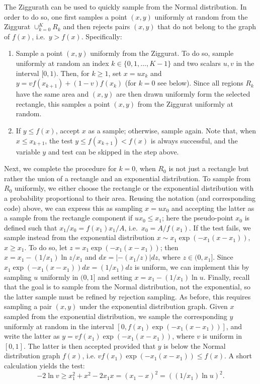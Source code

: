 The Ziggurath can be used to quickly sample from the Normal distribution. In order to do so, one first samples a point $(x,y)$ uniformly at random from the Ziggurat $\cup_{k=0}^K R_k$ and then rejects pairs $(x,y)$ that do not belong to the graph of $f(x)$, i.e.\ $y > f(x)$. Specifically:
\begin{enumerate}
\item Sample a point $(x,y)$ uniformly from the Ziggurat. To do so, sample uniformly at random an index $k \in\{0,1,\dots,K-1\}$ and two scalars $u,v$ in the interval $[0,1)$. Then, for $k\geq 1$, set $x = u x_k$ and $y = v f(x_{k+1}) + (1-v)f(x_k)$ (for $k=0$ see below). Since all regions $R_k$ have the same area and $(x,y)$ are then drawn uniformly form the selected rectangle, this samples a point $(x,y)$ from the Ziggurat uniformly at random.
\item If $y \leq f(x)$, accept $x$ as a sample; otherwise, sample again. Note that, when $x \leq x_{k+1}$, the test $y \leq f(x_{k+1}) < f(x)$ is always successful, and the variable $y$ and test can be skipped in the step above.
\end{enumerate}
Next, we complete the procedure for $k=0$, when $R_0$ is not just a rectangle but rather the union of a rectangle and an exponential distribution. To sample from $R_0$ uniformly, we either choose the rectangle or the exponential distribution with a probability proportional to their area. Reusing the notation (and corresponding code) above, we can express this as sampling $x = u x_0$ and accepting the latter as a sample from the rectangle component if $ux_0 \leq x_1$; here the pseudo-point $x_0$ is defined such that $x_1 / x_0 = f(x_1)x_1 / A$, i.e.\ $x_0 = A/f(x_1)$. If the test fails, we sample instead from the exponential distribution $x\sim x_1\exp(-x_1(x-x_1)),$ $x\geq x_1$. To do so, let $z= x_1\exp(-x_1(x-x_1))$; then $x = x_1 - (1/x_1) \ln z/x_1$ and $dx = |- (x_1/z)|dz$, where $z\in(0,x_1]$. Since $x_1\exp(-x_1(x-x_1)) dx = (1/x_1) dz$ is uniform, we can implement this by sampling $u$ uniformly in $(0,1]$ and setting $x = x_1 - (1/x_1) \ln u$. Finally, recall that the goal is to sample from the Normal distribution, not the exponential, so the latter sample must be refined by rejection sampling. As before, this requires sampling a pair $(x,y)$ under the exponential distribution graph. Given $x$ sampled from the exponential distribution, we sample the corresponding $y$ uniformly at random in the interval $[0, f(x_1) \exp(-x_1(x-x_1))]$, and write the latter as $y = v f(x_1) \exp(-x_1(x-x_1))$, where $v$ is uniform in $[0,1]$. The latter is then accepted provided that $y$ is below the Normal distribution graph $f(x)$, i.e. $v f(x_1) \exp(-x_1(x-x_1)) \leq f(x).$ A short calculation yields the test:
\[
-2\ln v \geq x_1^2 +  x^2 - 2x_1x = (x_1 - x)^2 =
((1/x_1) \ln u)^2.
\]

